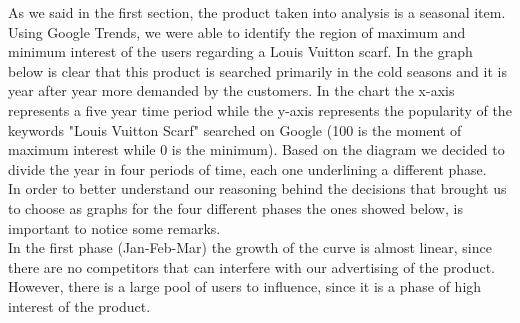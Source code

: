 As we said in the first section, the product taken into analysis is a seasonal item. Using Google Trends, we were able to identify the region of maximum and minimum interest of the users regarding a Louis Vuitton scarf. In the graph below is clear that this product is searched primarily in the cold seasons and it is year after year more demanded by the customers. In the chart the x-axis represents a five year time period while the y-axis represents the popularity of the keywords "Louis Vuitton Scarf" searched on Google (100 is the moment of maximum interest while 0 is the minimum).
Based on the diagram we decided to divide the year in four periods of time, each one underlining a different phase.\newline\\
In order to better understand our reasoning behind the decisions that brought us to choose as graphs for the four different phases the ones showed below, is important to notice some remarks. \\In the first phase (Jan-Feb-Mar) the growth of the curve is almost linear, since there are no competitors that can interfere with our advertising of the product. However, there is a large pool of users to influence, since it is a phase of high interest of the product.\\\\

